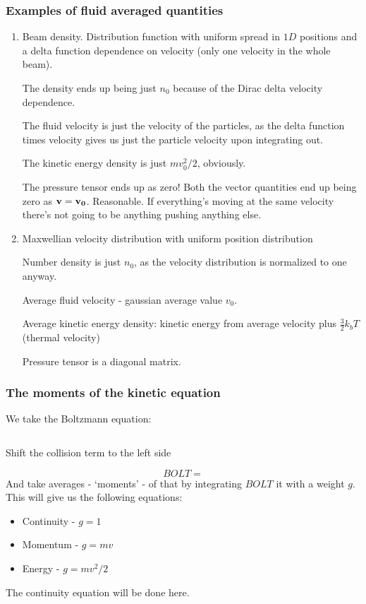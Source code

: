 \documentclass[PlasmaNotes.tex]{subfiles}
\begin{document}
\subsubsection{Examples of fluid averaged quantities}
\begin{enumerate}
\item Beam density. Distribution function with uniform spread in $1D$ positions and a delta function dependence on velocity (only one velocity in the whole beam).

The density ends up being just $n_0$ because of the Dirac delta velocity dependence.

The fluid velocity is just the velocity of the particles, as the delta function times velocity gives us just the particle velocity upon integrating out.

The kinetic energy density is just $m v_0^2/2$, obviously.

The pressure tensor ends up as zero! Both the vector quantities end up being zero as $\mathbf{v} = \mathbf{v_0}$. Reasonable. If everything's moving at the same velocity there's not going to be anything pushing anything else.

\item Maxwellian velocity distribution with uniform position distribution
\[ \]

Number density is just $n_0$, as the velocity distribution is normalized to one anyway.

Average fluid velocity - gaussian average value $v_0$. 

Average kinetic energy density: kinetic energy from average velocity plus $\frac{3}{2} k_b T$ (thermal velocity)

Pressure tensor is a diagonal matrix.
\[ \]
\end{enumerate}

\subsubsection{The moments of the kinetic equation}

We take the Boltzmann equation:

\[ \]

Shift the collision term to the left side

\[BOLT =  \]
And take averages - `moments' - of that by integrating $BOLT$ it with a weight $g$. This will give us the following equations:
\begin{itemize}
\item Continuity - $g=1$
\item Momentum - $g=mv$
\item Energy - $g=mv^2/2$
\end{itemize}
The continuity equation will be done here.
\end{document}
